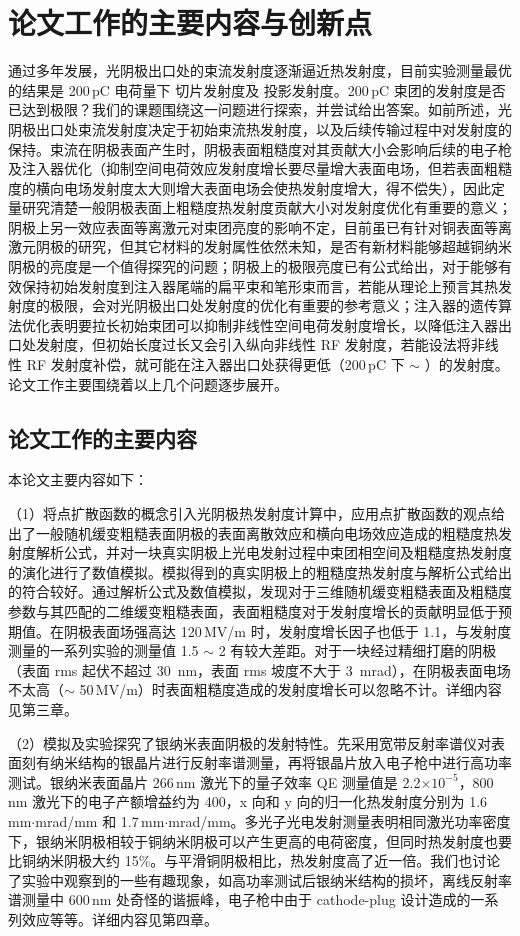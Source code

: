 \section{论文工作的主要内容与创新点}
通过多年发展，光阴极出口处的束流发射度逐渐逼近热发射度，目前实验测量最优的结果是 200\,pC 电荷量下  切片发射度及  投影发射度。200\,pC 束团的发射度是否已达到极限？我们的课题围绕这一问题进行探索，并尝试给出答案。如前所述，光阴极出口处束流发射度决定于初始束流热发射度，以及后续传输过程中对发射度的保持。束流在阴极表面产生时，阴极表面粗糙度对其贡献大小会影响后续的电子枪及注入器优化（抑制空间电荷效应发射度增长要尽量增大表面电场，但若表面粗糙度的横向电场发射度太大则增大表面电场会使热发射度增大，得不偿失），因此定量研究清楚一般阴极表面上粗糙度热发射度贡献大小对发射度优化有重要的意义；阴极上另一效应表面等离激元对束团亮度的影响不定，目前虽已有针对铜表面等离激元阴极的研究，但其它材料的发射属性依然未知，是否有新材料能够超越铜纳米阴极的亮度是一个值得探究的问题；阴极上的极限亮度已有公式给出，对于能够有效保持初始发射度到注入器尾端的扁平束和笔形束而言，若能从理论上预言其热发射度的极限，会对光阴极出口处发射度的优化有重要的参考意义；注入器的遗传算法优化表明要拉长初始束团可以抑制非线性空间电荷发射度增长，以降低注入器出口处发射度，但初始长度过长又会引入纵向非线性 RF 发射度，若能设法将非线性 RF 发射度补偿，就可能在注入器出口处获得更低（200\,pC 下 $\sim$ ）的发射度。论文工作主要围绕着以上几个问题逐步展开。

\subsection{论文工作的主要内容}
本论文主要内容如下：

（1）将点扩散函数的概念引入光阴极热发射度计算中，应用点扩散函数的观点给出了一般随机缓变粗糙表面阴极的表面离散效应和横向电场效应造成的粗糙度热发射度解析公式，并对一块真实阴极上光电发射过程中束团相空间及粗糙度热发射度的演化进行了数值模拟。模拟得到的真实阴极上的粗糙度热发射度与解析公式给出的符合较好。通过解析公式及数值模拟，发现对于三维随机缓变粗糙表面及粗糙度参数与其匹配的二维缓变粗糙表面，表面粗糙度对于发射度增长的贡献明显低于预期值。在阴极表面场强高达 120\,MV/m 时，发射度增长因子也低于 1.1，与发射度测量的一系列实验的测量值 1.5 $\sim$ 2 有较大差距。对于一块经过精细打磨的阴极（表面 rms 起伏不超过 \SI{30}{nm}，表面 rms 坡度不大于 \SI{3}{mrad}），在阴极表面电场不太高（$\sim$ 50\,MV/m）时表面粗糙度造成的发射度增长可以忽略不计。详细内容见第三章。

（2）模拟及实验探究了银纳米表面阴极的发射特性。先采用宽带反射率谱仪对表面刻有纳米结构的银晶片进行反射率谱测量，再将银晶片放入电子枪中进行高功率测试。银纳米表面晶片 266\,nm 激光下的量子效率 QE 测量值是 2.2$\times10^{-5}$，800\,nm 激光下的电子产额增益约为 400，x 向和 y 向的归一化热发射度分别为 1.6\,mm$\cdot$mrad/mm 和 1.7\,mm$\cdot$mrad/mm。多光子光电发射测量表明相同激光功率密度下，银纳米阴极相较于铜纳米阴极可以产生更高的电荷密度，但同时热发射度也要比铜纳米阴极大约 15\%。与平滑铜阴极相比，热发射度高了近一倍。我们也讨论了实验中观察到的一些有趣现象，如高功率测试后银纳米结构的损坏，离线反射率谱测量中 600\,nm 处奇怪的谐振峰，电子枪中由于 cathode-plug 设计造成的一系列效应等等。详细内容见第四章。

